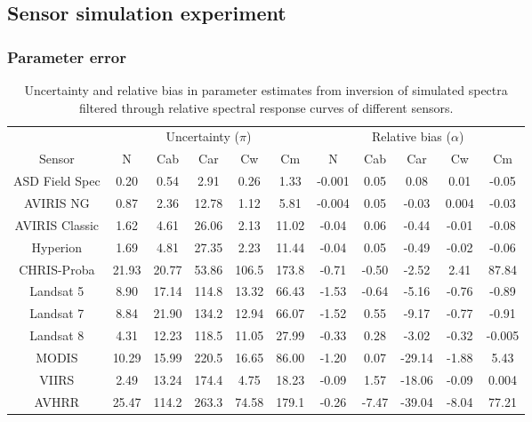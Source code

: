 \subsection{Sensor simulation experiment}

\subsubsection{Parameter error}

\begin{table}
  \centering
  \caption{%
    Uncertainty and relative bias in parameter estimates from inversion of simulated spectra filtered through relative spectral response curves of different sensors.
  }\label{tab:pecanrtm-sensorerror}
  \begin{tabular}{ccccccccccc}
    \toprule
    & \multicolumn{5}{c}{Uncertainty ($\pi$)} & \multicolumn{5}{c}{Relative bias ($\alpha$)} \\
    Sensor & N & Cab & Car & Cw & Cm & N & Cab & Car & Cw & Cm \\
    ASD Field Spec & 0.20 & 0.54 & 2.91 & 0.26 & 1.33 & -0.001 & 0.05 & 0.08 & 0.01 & -0.05 \\
    AVIRIS NG & 0.87 & 2.36 & 12.78 & 1.12 & 5.81 & -0.004 & 0.05 & -0.03 & 0.004 & -0.03 \\
    AVIRIS Classic & 1.62 & 4.61 & 26.06 & 2.13 & 11.02 & -0.04 & 0.06 & -0.44 & -0.01 & -0.08 \\
    Hyperion & 1.69 & 4.81 & 27.35 & 2.23 & 11.44 & -0.04 & 0.05 & -0.49 & -0.02 & -0.06 \\
    CHRIS-Proba & 21.93 & 20.77 & 53.86 & 106.5 & 173.8 & -0.71 & -0.50 & -2.52 & 2.41 & 87.84 \\
    Landsat 5 & 8.90 & 17.14 & 114.8 & 13.32 & 66.43 & -1.53 & -0.64 & -5.16 & -0.76 & -0.89 \\
    Landsat 7 & 8.84 & 21.90 & 134.2 & 12.94 & 66.07 & -1.52 & 0.55 & -9.17 & -0.77 & -0.91 \\
    Landsat 8 & 4.31 & 12.23 & 118.5 & 11.05 & 27.99 & -0.33 & 0.28 & -3.02 & -0.32 & -0.005 \\
    MODIS & 10.29 & 15.99 & 220.5 & 16.65 & 86.00 & -1.20 & 0.07 & -29.14 & -1.88 & 5.43 \\
    VIIRS & 2.49 & 13.24 & 174.4 & 4.75 & 18.23 & -0.09 & 1.57 & -18.06 & -0.09 & 0.004 \\
    AVHRR & 25.47 & 114.2 & 263.3 & 74.58 & 179.1 & -0.26 & -7.47 & -39.04 & -8.04 & 77.21 \\
  \end{tabular}
\end{table}

